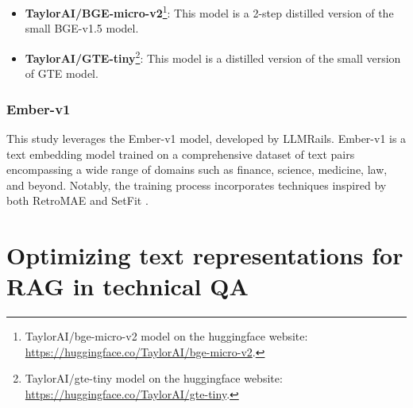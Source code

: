 \begin{itemize}
  \item \textbf{TaylorAI/BGE-micro-v2}\footnote{TaylorAI/bge-micro-v2 model on the huggingface website: \url{https://huggingface.co/TaylorAI/bge-micro-v2}.}:
 This model is a 2-step distilled \cite{sanh2020distilbert} version of the small \ac{BGE}-v1.5 model.
  \item \textbf{TaylorAI/GTE-tiny}\footnote{TaylorAI/gte-tiny model on the huggingface website: \url{https://huggingface.co/TaylorAI/gte-tiny}.}:
 This model is a distilled \cite{sanh2020distilbert} version of the small version of \ac{GTE} model.
\end{itemize}

\subsubsection{Ember-v1}
This study leverages the Ember-v1 model, developed by LLMRails.
Ember-v1 is a text embedding model trained on a comprehensive dataset of text pairs encompassing a wide range of domains such as finance, science, medicine, law, and beyond.
Notably, the training process incorporates techniques inspired by both \ac{RetroMAE} \cite{xiao2022retromae} and SetFit \cite{tunstall2022efficient}. 





\section{Optimizing text representations for \ac{RAG} in technical \ac{QA}}

